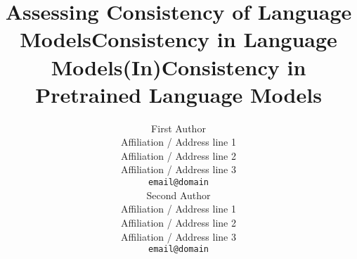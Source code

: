 \documentclass[11pt]{article}
\title{Assessing Consistency of Language Models}
\title{Consistency in Language Models}
\title{(In)Consistency in Pretrained Language Models}
\author{First Author \\
  Affiliation / Address line 1 \\
  Affiliation / Address line 2 \\
  Affiliation / Address line 3 \\
  \texttt{email@domain} \\\And
  Second Author \\
  Affiliation / Address line 1 \\
  Affiliation / Address line 2 \\
  Affiliation / Address line 3 \\
  \texttt{email@domain} \\}
\begin{document}
\maketitle
\begin{abstract}

\end{abstract}


% 


















% 

% 







\appendix




\end{document}
